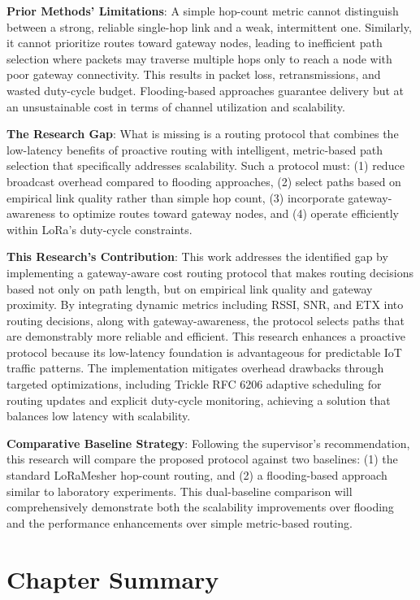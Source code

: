 \textbf{Prior Methods' Limitations}: A simple hop-count metric cannot distinguish between a strong, reliable single-hop link and a weak, intermittent one. Similarly, it cannot prioritize routes toward gateway nodes, leading to inefficient path selection where packets may traverse multiple hops only to reach a node with poor gateway connectivity. This results in packet loss, retransmissions, and wasted duty-cycle budget. Flooding-based approaches guarantee delivery but at an unsustainable cost in terms of channel utilization and scalability.

\textbf{The Research Gap}: What is missing is a routing protocol that combines the low-latency benefits of proactive routing with intelligent, metric-based path selection that specifically addresses scalability. Such a protocol must: (1) reduce broadcast overhead compared to flooding approaches, (2) select paths based on empirical link quality rather than simple hop count, (3) incorporate gateway-awareness to optimize routes toward gateway nodes, and (4) operate efficiently within LoRa's duty-cycle constraints.

\textbf{This Research's Contribution}: This work addresses the identified gap by implementing a gateway-aware cost routing protocol that makes routing decisions based not only on path length, but on empirical link quality and gateway proximity. By integrating dynamic metrics including RSSI, SNR, and ETX into routing decisions, along with gateway-awareness, the protocol selects paths that are demonstrably more reliable and efficient. This research enhances a proactive protocol because its low-latency foundation is advantageous for predictable IoT traffic patterns. The implementation mitigates overhead drawbacks through targeted optimizations, including Trickle RFC 6206 adaptive scheduling for routing updates and explicit duty-cycle monitoring, achieving a solution that balances low latency with scalability.

\textbf{Comparative Baseline Strategy}: Following the supervisor's recommendation, this research will compare the proposed protocol against two baselines: (1) the standard LoRaMesher hop-count routing, and (2) a flooding-based approach similar to laboratory experiments. This dual-baseline comparison will comprehensively demonstrate both the scalability improvements over flooding and the performance enhancements over simple metric-based routing.

\section{Chapter Summary}

